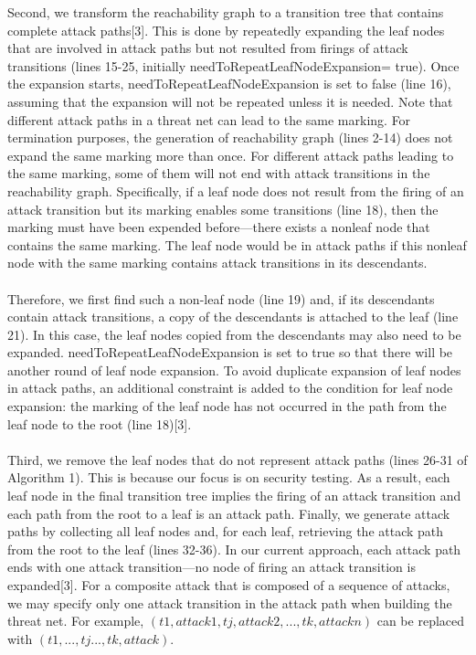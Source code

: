 Second, we transform the reachability graph to a
transition tree that contains complete attack paths[3]. This is
done by repeatedly expanding the leaf nodes that are
involved in attack paths but not resulted from firings of
attack transitions (lines 15-25, initially needToRepeatLeafNodeExpansion= true). Once the expansion starts, needToRepeatLeafNodeExpansion is set to false (line 16), assuming that the expansion will not be repeated unless it is needed. Note
that different attack paths in a threat net can lead to the same marking. For termination purposes, the generation of reachability graph (lines 2-14) does not expand the same marking more than once. For different attack paths leading
to the same marking, some of them will not end with attack transitions in the reachability graph. Specifically, if a leaf node does not result from the firing of an attack transition but its marking enables some transitions (line 18), then the
marking must have been expended before—there exists a nonleaf node that contains the same marking. The leaf node would be in attack paths if this nonleaf node with the same marking contains attack transitions in its descendants.
\paragraph*{} Therefore, we first find such a non-leaf node (line 19) and, if
its descendants contain attack transitions, a copy of the
descendants is attached to the leaf (line 21). In this case,
the leaf nodes copied from the descendants may also need
to be expanded. needToRepeatLeafNodeExpansion is set to true
so that there will be another round of leaf node expansion.
To avoid duplicate expansion of leaf nodes in attack paths,
an additional constraint is added to the condition for leaf
node expansion: the marking of the leaf node has not
occurred in the path from the leaf node to the root (line 18)[3].
\paragraph{}
Third, we remove the leaf nodes that do not represent
attack paths (lines 26-31 of Algorithm 1). This is because our
focus is on security testing. As a result, each leaf node in the
final transition tree implies the firing of an attack transition
and each path from the root to a leaf is an attack path.
Finally, we generate attack paths by collecting all leaf nodes
and, for each leaf, retrieving the attack path from the root to
the leaf (lines 32-36). In our current approach, each attack
path ends with one attack transition—no node of firing an
attack transition is expanded[3]. For a composite attack that is
composed of a sequence of attacks, we may specify only one
attack transition in the attack path when building the threat
net. For example, $(t1, attack1, tj, attack2,. . ., tk, attackn)$
can be replaced with $(t1,. . .,tj. . ., tk, attack)$.


